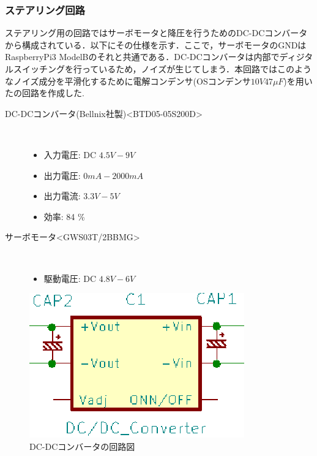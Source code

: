 \newpage

\subsubsection{ステアリング回路}
ステアリング用の回路ではサーボモータと降圧を行うためのDC-DCコンバータから構成されている．以下にその仕様を示す．ここで，サーボモータのGNDはRaspberryPi3 ModelBのそれと共通である．DC-DCコンバータは内部でディジタルスイッチングを行っているため，ノイズが生じてしまう\cite{dcdc}．本回路ではこのようなノイズ成分を平滑化するために電解コンデンサ(OSコンデンサ$10\unit{V}47\unit{\mu F}$)を用いたの回路を作成した\cite{dcdcconverter}.

\begin{description}
    \item[DC-DCコンバータ(Bellnix社製)\textless BTD05-05S200D\textgreater \cite{dcdcconverter}]\mbox{}\\
    \vspace{-5mm}
        \begin{itemize}
            \item 入力電圧: DC $4.5\unit{V}-9\unit{V}$
            \item 出力電圧: $0\unit{mA}-2000\unit{mA}$
            \item 出力電流: $3.3\unit{V}-5\unit{V}$
            \item 効率: 84 \%
        \end{itemize}
     \item[サーボモータ\textless GWS03T/2BBMG\textgreater]\mbox{}\\
    \vspace{-5mm}
         \begin{itemize}
            \item 駆動電圧: DC $4.8\unit{V}-6\unit{V}$
        \end{itemize}
\end{description}


\begin{figure}[h]
\centering
\includegraphics[scale=0.8]{picture/eps/dcdc_unit.eps}
\caption{DC-DCコンバータの回路図}
\label{fig::dcdc_unit}
\end{figure}

